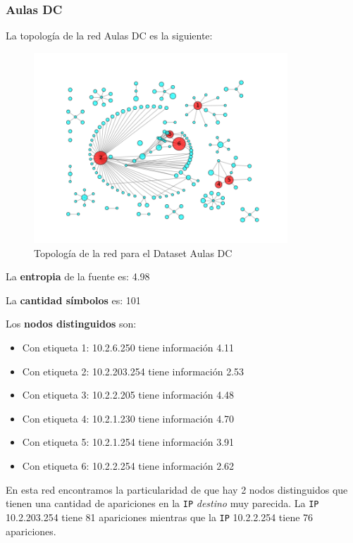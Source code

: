 \subsubsection{Aulas DC}

La topología de la red Aulas DC es la siguiente:

\begin{figure}[H]
    \centering
    \includegraphics[width=0.85\textwidth]{imagenes/aulasDC.png}
    \caption{Topología de la red para el Dataset Aulas DC}
\end{figure}

La \textbf{entropia} de la fuente es: 4.98

La \textbf{cantidad símbolos} es: 101

Los \textbf{nodos distinguidos} son:

\begin{itemize}
    \item Con etiqueta 1: 10.2.6.250 tiene información 4.11
    \item Con etiqueta 2: 10.2.203.254 tiene información 2.53
    \item Con etiqueta 3: 10.2.2.205 tiene información 4.48
    \item Con etiqueta 4: 10.2.1.230 tiene información 4.70
    \item Con etiqueta 5: 10.2.1.254 tiene información 3.91
    \item Con etiqueta 6: 10.2.2.254 tiene información 2.62
\end{itemize}

En esta red encontramos la particularidad de que hay 2 nodos distinguidos que tienen
una cantidad de apariciones en la \texttt{IP} \textit{destino} muy parecida.
La \texttt{IP} 10.2.203.254 tiene 81 apariciones mientras que la \texttt{IP} 10.2.2.254 tiene 76 apariciones.

